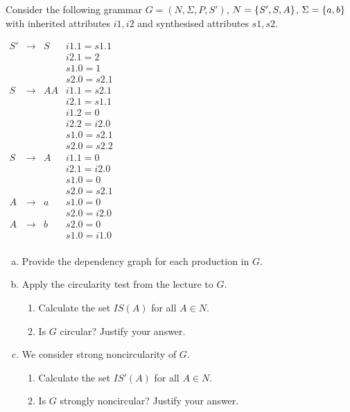 \begin{exercise}{30}
Consider the following grammar $G = (N, \Sigma, P, S')$, $N=\left\{ S', S, A \right\}$, $\Sigma=\left\{ a, b \right\}$ with inherited attributes $i1, i2$ and synthesised attributes $s1, s2$.

\vspace{0.3cm}

  \begin{center}
	$\begin{array}{lcll}
	  S' &\to& S & i1.1 = s1.1 \\
	  &&& i2.1 = 2 \\
	  &&& s1.0 = 1 \\
	  &&& s2.0 = s2.1 \\
	  S &\to& AA & i1.1 = s2.1 \\
	  &&& i2.1 = s1.1 \\
	  &&& i1.2 = 0 \\
	  &&& i2.2 = i2.0 \\
	  &&& s1.0 = s2.1 \\
	  &&& s2.0 = s2.2 \\
	  S &\to& A & i1.1 = 0 \\
	  &&& i2.1 = i2.0 \\
	  &&& s1.0 = 0 \\
	  &&& s2.0 = s2.1 \\
	  A &\to& a & s1.0 = 0 \\
	  &&& s2.0 = i2.0 \\
	  A &\to& b & s2.0 = 0 \\
	  &&& s1.0 = i1.0 \\
	\end{array}$
   \end{center}

\begin{enumerate}[(a)]
  \item Provide the dependency graph for each production in $G$.

  \item Apply the circularity test from the lecture to $G$.

  \begin{enumerate}[1.]
      \item Calculate the set $IS(A)$ for all $A \in N$.
      \item Is $G$ circular? Justify your answer.
  \end{enumerate}

  \item We consider strong noncircularity of $G$.

  \begin{enumerate}[1.]
      \item Calculate the set $IS'(A)$ for all $A \in N$.
      \item Is $G$ strongly noncircular? Justify your answer.
  \end{enumerate}

  \end{enumerate}
\end{exercise}

